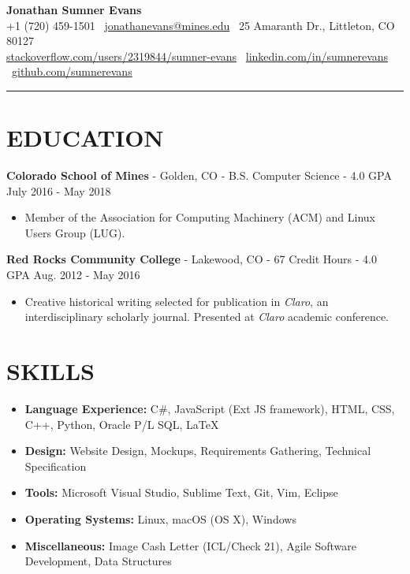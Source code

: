 \documentclass[10.5pt,letterpaper]{article}
\begin{document}
\begin{center}
    \huge\textbf{Jonathan Sumner Evans}\\
    \vspace{3pt}
    \small +1 (720) 459-1501
    \textbar\ \href{mailto:jonathanevans@mines.edu}{jonathanevans@mines.edu}
    \textbar\ 25 Amaranth Dr., Littleton, CO 80127 \\
    \href{http://stackoverflow.com/users/2319844/sumner-evans}{stackoverflow.com/users/2319844/sumner-evans}
    \textbar\ \href{https://www.linkedin.com/in/sumnerevans}{linkedin.com/in/sumnerevans}
    \textbar\ \href{https://github.com/sumnerevans}{github.com/sumnerevans}
    \rule{\textwidth}{0.5pt}
\end{center}

\section*{EDUCATION}
\textbf{Colorado School of Mines} - Golden, CO - B.S. Computer Science - 4.0 GPA \hfill
July 2016 - May 2018
\begin{itemize}
    \item Member of the Association for Computing Machinery (ACM) and Linux Users Group (LUG).
\end{itemize}

\vspace{4pt}
\textbf{Red Rocks Community College} - Lakewood, CO - 67 Credit Hours - 4.0 GPA \hfill
Aug. 2012 - May 2016
\begin{itemize}
    \item Creative historical writing selected for publication in \textit{Claro}, an
        interdisciplinary scholarly journal. Presented at \textit{Claro} academic conference.
\end{itemize}

\section*{SKILLS}
{
    \renewcommand\labelitemi{}
    \renewcommand\leftmargini{0pt}
    \begin{itemize}
        \item \textbf{Language Experience:} C\#, JavaScript (Ext JS framework), HTML, CSS, C++,
            Python, Oracle P/L SQL, \LaTeX
        \item \textbf{Design:} Website Design, Mockups, Requirements Gathering, Technical
            Specification
        \item \textbf{Tools:} Microsoft Visual Studio, Sublime Text, Git, Vim, Eclipse
        \item \textbf{Operating Systems:} Linux, macOS (OS X), Windows
        \item \textbf{Miscellaneous:} Image Cash Letter (ICL/Check 21), Agile Software Development,
            Data Structures
    \end{itemize}
}
\end{document}

